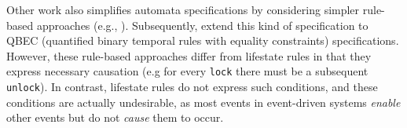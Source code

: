 \documentclass[10pt,reprint,nocopyrightspace,numbers]{sigplanconf}
\begin{document}

Other work also simplifies automata specifications by considering simpler rule-based approaches (e.g., \cite{dynamic-alternating-rules, static-alternating-rules}).
Subsequently, \citet{lo-qbec} extend this kind of specification to QBEC (quantified binary temporal rules with equality constraints) specifications.
However, these rule-based approaches differ from lifestate rules in that they express necessary causation (e.g for every \texttt{lock} there must be a subsequent \texttt{unlock}). In contrast, lifestate rules do not express such conditions, and these conditions are actually undesirable, as most events in event-driven systems \emph{enable} other events but do not \emph{cause} them to occur.

\end{document}
